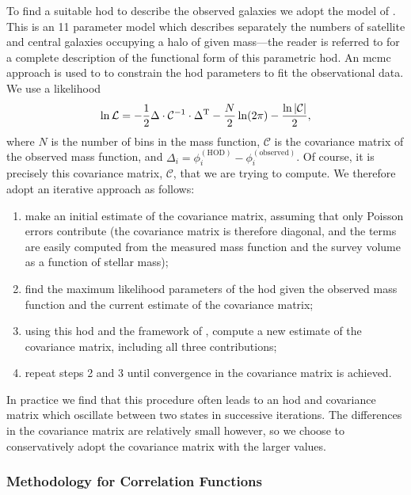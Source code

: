 To find a suitable \gls{hod} to describe the observed galaxies we adopt the model of \cite{behroozi_comprehensive_2010}. This is an 11 parameter model which describes separately the numbers of satellite and central galaxies occupying a halo of given mass---the reader is referred to \cite{behroozi_comprehensive_2010} for a complete description of the functional form of this parametric \gls{hod}. An \gls{mcmc} approach is used to to constrain the \gls{hod} parameters to fit the observational data. We use a likelihood
\begin{equation}
 \ln \mathcal{L} = -{1\over 2} \Delta\cdot \mathcal{C}^{-1}\cdot \Delta^\mathrm{T} - {N \over 2} \ln(2\pi) - {\ln |\mathcal{C}| \over 2},
\end{equation}
where $N$ is the number of bins in the mass function, $\mathcal{C}$ is the covariance matrix of the observed mass function, and $\Delta_i = \phi_i^\mathrm{(HOD)} - \phi_i^\mathrm{(observed)}$. Of course, it is precisely this covariance matrix, $\mathcal{C}$, that we are trying to compute. We therefore adopt an iterative approach as follows:
\begin{enumerate}
 \item make an initial estimate of the covariance matrix, assuming that only Poisson errors contribute (the covariance matrix is therefore diagonal, and the terms are easily computed from the measured mass function and the survey volume as a function of stellar mass);
 \item find the maximum likelihood parameters of the \gls{hod} given the observed mass function and the current estimate of the covariance matrix;
 \item using this \gls{hod} and the framework of \cite{smith_how_2012}, compute a new estimate of the covariance matrix, including all three contributions;
 \item repeat steps 2 and 3 until convergence in the covariance matrix is achieved.
\end{enumerate}
In practice we find that this procedure often leads to an \gls{hod} and covariance matrix which oscillate between two states in successive iterations. The differences in the covariance matrix are relatively small however, so we choose to conservatively adopt the covariance matrix with the larger values.

\subsubsection{Methodology for Correlation Functions}

